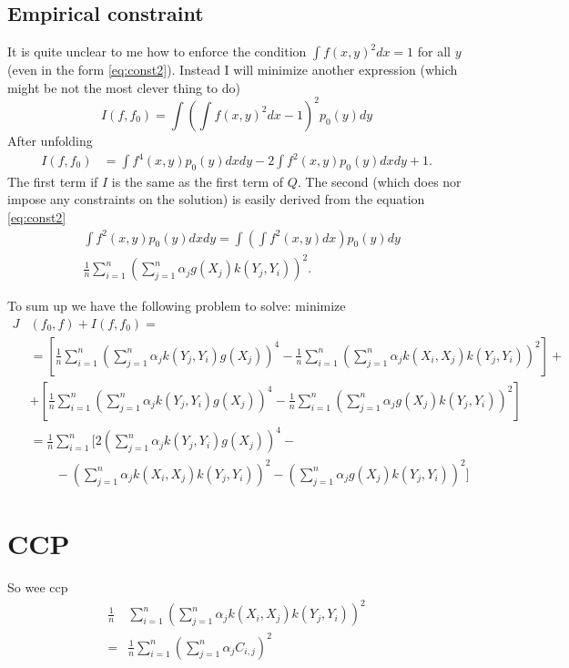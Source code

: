 \documentclass[10pt]{article}
\begin{document}
\subsection{Empirical constraint}
It is quite unclear to me how to enforce the condition $\int f(x,y)^2dx =1$ for all $y$ (even in the form \eqref{eq:const2}). Instead I will minimize another expression (which might be not the most clever thing to do)
\begin{equation}
 I(f,f_0) = \int \left( \int f(x,y)^2 dx -1 \right)^2 p_0(y) dy
\end{equation}
After unfolding
\begin{align}
 I(f,f_0) &= \int f^4(x,y) p_0(y) dx dy - 2 \int f^2(x,y) p_0(y) dx dy +1.
\end{align}
The first term if $I$ is the same as the first term of $Q$. The second (which does nor impose any constraints on the solution) is easily derived from the equation \eqref{eq:const2} 
\begin{align}
 &\int f^2(x,y) p_0(y) dx dy =  \int \left ( \int f^2(x,y) dx \right ) p_0(y)  dy\\ 
 &\frac 1 n \sum_{i=1}^n \left( \sum_{j=1}^{n} \alpha_j  g(X_{j})  k(Y_{j},Y_i) \right )^2 .
\end{align}

To sum up we have the following problem to solve: minimize 
\begin{align}
 J&(f_0,f) +I(f,f_0) = \\
 &=\left[  \frac 1 n \sum_{i=1}^{n} \left( \sum_{j=1}^{n} \alpha_j k(Y_j,Y_i) g(X_j) \right)^4 - \frac 1 n \sum_{i=1}^n \left( \sum_{j=1}^{n} \alpha_j k(X_i,X_j) k(Y_j,Y_i) \right)^2 \right] + \\
 &+ \left[  \frac 1 n \sum_{i=1}^{n} \left( \sum_{j=1}^{n} \alpha_j k(Y_j,Y_i) g(X_j) \right)^4 - \frac 1 n \sum_{i=1}^n \left( \sum_{j=1}^{n} \alpha_j  g(X_{j})  k(Y_{j},Y_i) \right )^2 \right] \\
 &=  \frac 1 n \sum_{i=1}^{n}   \Bigg [ 2 \left( \sum_{j=1}^{n} \alpha_j k(Y_j,Y_i) g(X_j) \right)^4 - \\
  & \quad \quad -\left( \sum_{j=1}^{n} \alpha_j k(X_i,X_j) k(Y_j,Y_i) \right)^2 - \left( \sum_{j=1}^{n} \alpha_j  g(X_{j})  k(Y_{j},Y_i) \right )^2 \Bigg]   
\end{align}

\section{CCP}

So wee ccp
\begin{align}
  \frac 1 n & \sum_{i=1}^{n} \left(   \sum_{j=1}^{n} \alpha_j k(X_i,X_j) k(Y_j,Y_i) \right)^2  \\
  = & \frac 1 n  \sum_{i=1}^{n} \left(   \sum_{j=1}^{n} \alpha_j C_{i,j} \right)^2 
\end{align}
\end{document}

